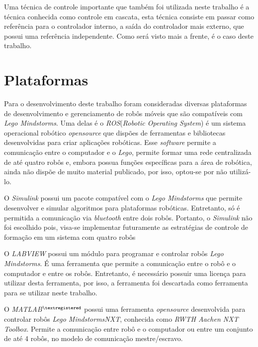 Uma técnica de controle importante que também foi utilizada neste trabalho é a técnica conhecida como controle em cascata, esta técnica consiste em passar como referência para o controlador interno, a saída do controlador mais externo, que possui uma referência independente.%
 Como será visto mais a frente, é o caso deste trabalho.

\section{Plataformas}
\label{sec:plataformas}
Para o desenvolvimento deste trabalho foram consideradas diversas plataformas de desenvolvimento e gerenciamento de robôs móveis que são compatíveis com \emph{Lego Mindstorms\textregistered}. %
Uma delas é o \emph{ROS}(\emph{Robotic Operating System}) é um sistema operacional robótico \emph{opensource} que dispões de ferramentas e bibliotecas desenvolvidas para criar aplicações robóticas. %
Esse \emph{software} permite a comunicação entre o computador e o \emph{Lego}, permite formar uma rede centralizada de até quatro robôs e, embora possua funções específicas para a área de robótica, ainda não dispõe de muito material publicado, por isso, optou-se por não utilizá-lo.

O \emph{Simulink} possui um pacote compatível com o \emph{Lego Mindstorms\textregistered} que permite desenvolver e simular algoritmos para plataformas robóticas. Entretanto, só é permitida a comunicação via \emph{bluetooth} entre dois robôs. Portanto, o \emph{Simulink} não foi escolhido pois, visa-se implementar futuramente as estratégias de controle de formação em um sistema com quatro robôs

O \emph{LABVIEW} possui um módulo para programar e controlar robôs \emph{Lego Mindstorms\textregistered}. É uma ferramenta que permite a comunicação entre o robô e o computador e entre os robôs. Entretanto, é necessário possuir uma licença para utilizar desta ferramenta, por isso, a ferramenta foi descartada como ferramenta para se utilizar neste trabalho.

O \emph{MATLAB$^{\textregistered}$} possui uma ferramenta \emph{opensource} desenvolvida para controlar robôs \emph{Lego Mindstorms\textregistered NXT}, conhecida como \emph{RWTH Aachen NXT Toolbox}. Permite a comunicação entre robô e o computador ou entre um conjunto de até 4 robôs, no modelo de comunicação mestre/escravo. 


